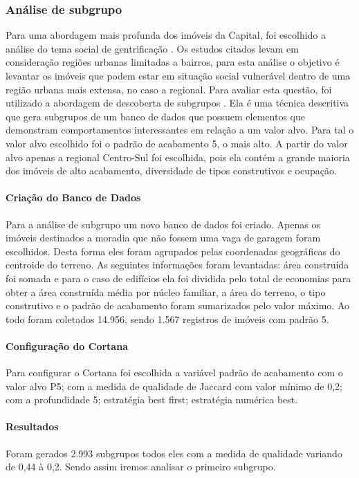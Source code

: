 \documentclass[12pt]{article}
\begin{document}
\subsubsection{Análise de subgrupo}
Para uma abordagem mais profunda dos imóveis da Capital, foi escolhido a análise do tema social de gentrificação \cite{dos2019sapucai, solla2019resistencia, andrade2020urban}. Os estudos citados levam em consideração regiões urbanas limitadas a bairros, para esta análise o objetivo é levantar os imóveis que podem estar em situação social vulnerável dentro de uma região urbana mais extensa, no caso a regional. Para avaliar esta questão, foi utilizado a abordagem de descoberta de subgrupos \cite{atzmueller2015subgroup}. Ela é uma técnica descritiva que gera subgrupos de um banco de dados que possuem elementos que demonstram comportamentos interessantes em relação a um valor alvo. Para tal o valor alvo escolhido foi o padrão de acabamento 5, o mais alto. A partir do valor alvo apenas a regional Centro-Sul foi escolhida, pois ela contém a grande maioria dos imóveis de alto acabamento, diversidade de tipos construtivos e ocupação.

\paragraph{Criação do Banco de Dados}
Para a análise de subgrupo um novo banco de dados foi criado. Apenas os imóveis destinados a moradia que não fossem uma vaga de garagem foram escolhidos. Desta forma eles foram agrupados pelas coordenadas geográficas do centroide do terreno. As seguintes informações foram levantadas: área construída foi somada e para o caso de edifícios ela foi dividida pelo total de economias para obter a área construída média por núcleo familiar, a área do terreno, o tipo construtivo e o padrão de acabamento foram sumarizados pelo valor máximo. Ao todo foram coletados 14.956, sendo 1.567 registros de imóveis com padrão 5.

\paragraph{Configuração do Cortana}
Para configurar o Cortana foi escolhida a variável padrão de acabamento com o valor alvo P5; com a medida de qualidade de Jaccard com valor mínimo de 0,2; com a profundidade 5; estratégia best first; estratégia numérica best.

\paragraph{Resultados}
Foram gerados 2.993 subgrupos todos eles com a medida de qualidade variando de 0,44 à 0,2. Sendo assim iremos analisar o primeiro subgrupo.
\end{document}
